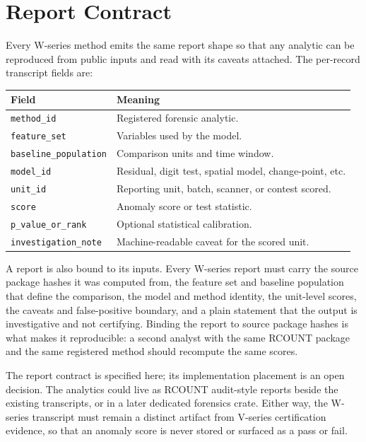 \section{Report Contract}

Every W-series method emits the same report shape so that any analytic can be
reproduced from public inputs and read with its caveats attached. The per-record
transcript fields are:

\begin{center}
\small
\begin{tabularx}{\textwidth}{lX}
\toprule
Field & Meaning \\
\midrule
\texttt{method\_id} & Registered forensic analytic. \\
\texttt{feature\_set} & Variables used by the model. \\
\texttt{baseline\_population} & Comparison units and time window. \\
\texttt{model\_id} & Residual, digit test, spatial model, change-point, etc. \\
\texttt{unit\_id} & Reporting unit, batch, scanner, or contest scored. \\
\texttt{score} & Anomaly score or test statistic. \\
\texttt{p\_value\_or\_rank} & Optional statistical calibration. \\
\texttt{investigation\_note} & Machine-readable caveat for the scored unit. \\
\bottomrule
\end{tabularx}
\end{center}

A report is also bound to its inputs. Every W-series report must carry the
source package hashes it was computed from, the feature set and baseline
population that define the comparison, the model and method identity, the
unit-level scores, the caveats and false-positive boundary, and a plain
statement that the output is investigative and not certifying. Binding the
report to source package hashes is what makes it reproducible: a second analyst
with the same RCOUNT package and the same registered method should recompute the
same scores.

The report contract is specified here; its implementation placement is an open
decision. The analytics could live as RCOUNT audit-style reports beside the
existing transcripts, or in a later dedicated forensics crate. Either way, the
W-series transcript must remain a distinct artifact from V-series certification
evidence, so that an anomaly score is never stored or surfaced as a pass or
fail.
